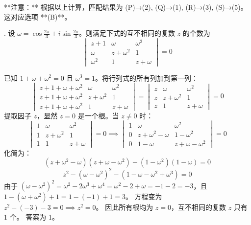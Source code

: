 \begin{questions}
\begin{solution}
**注意：** 根据以上计算，匹配结果为 (P)→(2), (Q)→(1), (R)→(3), (S)→(5)。这对应选项 **(B)**。
\end{solution}

. 设 \(\omega = \cos \frac{2\pi}{3} + i \sin \frac{2\pi}{3}\)。则满足下式的互不相同的复数 \(z\) 的个数为
\[
\begin{vmatrix} z + 1 & \omega & \omega^{2} \\ \omega & z + \omega^{2} & 1 \\ \omega^{2} & 1 & z + \omega \end{vmatrix} = 0
\]

\begin{solution}
已知 \(1 + \omega + \omega^{2} = 0\) 且 \(\omega^{3} = 1\)。将行列式的所有列加到第一列：
\[
\begin{vmatrix} z + 1 + \omega + \omega^{2} & \omega & \omega^{2} \\ z + 1 + \omega + \omega^{2} & z + \omega^{2} & 1 \\ z + 1 + \omega + \omega^{2} & 1 & z + \omega \end{vmatrix} = \begin{vmatrix} z & \omega & \omega^{2} \\ z & z + \omega^{2} & 1 \\ z & 1 & z + \omega \end{vmatrix} = 0
\]
提取因子 \(z\)，显然 \(z = 0\) 是一个根。当 \(z \neq 0\) 时：
\[
\begin{vmatrix} 1 & \omega & \omega^{2} \\ 1 & z + \omega^{2} & 1 \\ 1 & 1 & z + \omega \end{vmatrix} = 0 \implies \begin{vmatrix} 1 & \omega & \omega^{2} \\ 0 & z + \omega^{2} - \omega & 1 - \omega^{2} \\ 0 & 1 - \omega & z + \omega - \omega^{2} \end{vmatrix} = 0
\]
化简为：
\[
(z + \omega^{2} - \omega)(z + \omega - \omega^{2}) - (1 - \omega^{2})(1 - \omega) = 0
\]
\[
z^{2} - (\omega - \omega^{2})^{2} - (1 - \omega - \omega^{2} + \omega^{3}) = 0
\]
由于 \((\omega - \omega^{2})^{2} = \omega^{2} - 2\omega^{3} + \omega^{4} = \omega^{2} - 2 + \omega = -1 - 2 = -3\)，且 \(1 - (\omega + \omega^{2}) + 1 = 1 - (-1) + 1 = 3\)。
方程变为 \(z^{2} - (-3) - 3 = 0 \implies z^{2} = 0\)。
因此所有根均为 \(z = 0\)，互不相同的复数 \(z\) 只有 1 个。
答案为 1。
\end{solution}


\end{questions}

